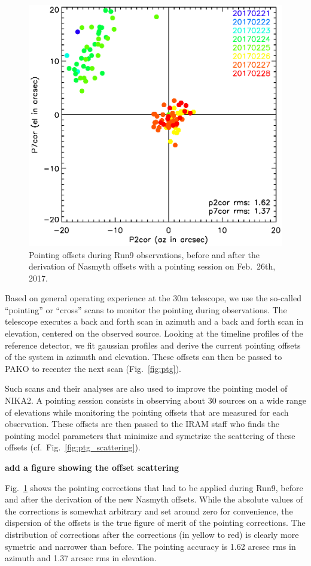 \begin{figure}[htp]
\begin{center}
\includegraphics[clip, angle=0, scale = 0.70]{Figures/pointing_stats_N2R9.eps}
\caption{Pointing offsets during Run9 observations, before and after the
  derivation of Nasmyth offsets with a pointing session on Feb.~26th, 2017.}
\label{fig:pointing_stats_n2r9}
\end{center}
\end{figure}

Based on general operating experience at the 30m telescope, we use the so-called
``pointing'' or ``cross'' scans to monitor the pointing during observations. The
telescope executes a back and forth scan in azimuth and a back and forth scan in
elevation, centered on the observed source. Looking at the timeline profiles of
the reference detector, we fit gaussian profiles and derive the current pointing
offsets of the system in azimuth and elevation. These offsets can then be passed
to PAKO to recenter the next scan (Fig.~\ref{fig:ptg}).

Such scans and their analyses are also used to improve the pointing model
of NIKA2. A pointing session consists in observing about 30 sources on a wide
range of elevations while monitoring the pointing offsets that are measured for
each observation. These offsets are then passed to the IRAM staff who finds
the pointing model parameters that minimize and symetrize the scattering of
these offsets
(cf.~Fig.~\ref{fig:ptg_scattering}).

{\bf add a figure showing the offset scattering}

Fig.~\ref{fig:pointing_stats_n2r9} shows
the pointing corrections that had to be applied during Run9, before and after
the derivation of the new Nasmyth offsets. While the absolute values of the
corrections is somewhat arbitrary and set around zero for convenience, the
dispersion of the offsets is the true figure of merit of the pointing
corrections. The distribution of corrections after the corrections (in yellow to
red) is clearly more symetric and narrower than before. The pointing accuracy is
1.62 arcsec rms in azimuth and 1.37 arcsec rms in elevation.
